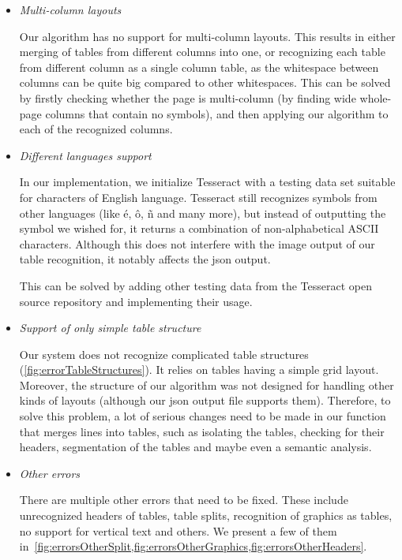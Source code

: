 \begin{itemize}
    \item \emph{Multi-column layouts}
    
    Our algorithm has no support for multi-column layouts. This results in either merging of tables from different columns into one, or recognizing each table from different column as a single column table, as the whitespace between columns can be quite big compared to other whitespaces. This can be solved by firstly checking whether the page is multi-column (by finding wide whole-page columns that contain no symbols), and then applying our algorithm to each of the recognized columns.
    
    \item \emph{Different languages support}
    
    In our implementation, we initialize Tesseract with a testing data set suitable for characters of English language. Tesseract still recognizes symbols from other languages (like é, ô, ñ and many more), but instead of outputting the symbol we wished for, it returns a combination of non-alphabetical ASCII characters. Although this does not interfere with the image output of our table recognition, it notably affects the json output.
    
    This can be solved by adding other testing data from the Tesseract open source repository and implementing their usage.
    
    \item \emph{Support of only simple table structure}
    
    Our system does not recognize complicated table structures (\cref{fig:errorTableStructures}). It relies on tables having a simple grid layout. Moreover, the structure of our algorithm was not designed for handling other kinds of layouts  (although our json output file supports them). Therefore, to solve this problem, a lot of serious changes need to be made in our function that merges lines into tables, such as isolating the tables, checking for their headers, segmentation of the tables and maybe even a semantic analysis.  
    
    \item \emph{Other errors}
    
    There are multiple other errors that need to be fixed. These include unrecognized headers of tables, table splits, recognition of graphics as tables, no support for vertical text and others. We present a few of them in~\cref{fig:errorsOtherSplit,fig:errorsOtherGraphics,fig:errorsOtherHeaders}.
    
\end{itemize}

